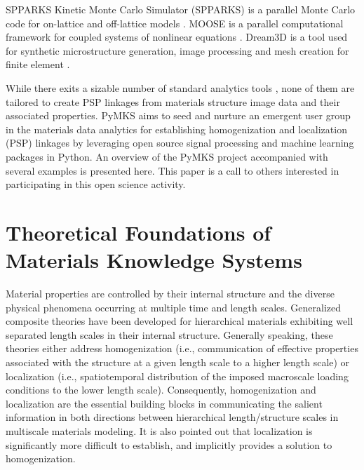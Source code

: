 \documentclass{bmcart}
\begin{document}
SPPARKS Kinetic Monte Carlo Simulator (SPPARKS) is a parallel Monte Carlo code for on-lattice and off-lattice models \cite{plimpton2012spparks}. MOOSE is a parallel computational framework for coupled systems of nonlinear equations \cite{gaston2009moose}. Dream3D is a tool used for synthetic microstructure generation, image processing and mesh creation for finite element \cite{groeber2014dream}.

While there exits a sizable number of standard analytics tools \cite{littell2006sas, seabold2010statsmodels, pedregosa2011scikit, albanese2012mlpy, goodfellow2013pylearn2, mckinney2012python, muller2014pystruct, demvsar2004orange, abadi2016tensorflow, van2014scikit}, none of them are tailored to create PSP linkages from materials structure image data and their associated properties. PyMKS aims to seed and nurture an emergent user group in the materials data analytics for establishing homogenization and localization (PSP) linkages by leveraging open source signal processing and machine learning packages in Python. An overview of the PyMKS project accompanied with several examples is presented here. This paper is a call to others interested in participating in this open science activity.

\section{Theoretical Foundations of Materials Knowledge Systems}

Material properties are controlled by their internal structure and the diverse physical phenomena occurring at multiple time and length scales. Generalized composite theories \cite{hill1963elastic, hashin1983analysis} have been developed for hierarchical materials exhibiting well separated length scales in their internal structure. Generally speaking, these theories either address homogenization (i.e., communication of effective properties associated with the structure at a given length scale to a higher length scale) or localization (i.e., spatiotemporal distribution of the imposed macroscale loading conditions to the lower length scale). Consequently, homogenization and localization are the essential building blocks in communicating the salient information in both directions between hierarchical length/structure scales in multiscale materials modeling. It is also pointed out that localization is significantly more difficult to establish, and implicitly provides a solution to homogenization.
\end{document}

